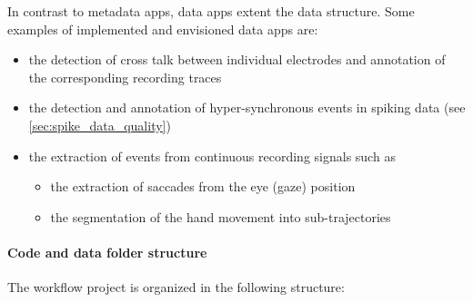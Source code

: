 In contrast to metadata apps, data apps extent the  data structure. Some examples of implemented and envisioned data apps are:
\begin{itemize}
  \setlength{\itemsep}{0pt}
  \setlength{\parskip}{0pt}
  \setlength{\parsep}{0pt}
 \item the detection of cross talk between individual electrodes and annotation of the corresponding recording traces
  \item the detection and annotation of hyper-synchronous events in spiking data (see \cref{sec:spike_data_quality})
 \item the extraction of events from continuous recording signals such as
 \begin{itemize}
  \setlength\itemsep{0pt}
  \setlength{\parskip}{0pt}
  \setlength{\parsep}{0pt}
  \item the extraction of saccades from the eye (gaze) position
  \item the segmentation of the hand movement into sub-trajectories
 \end{itemize}
\end{itemize}


\paragraph{Code and data folder structure}
The workflow project is organized in the following structure:\\

\renewcommand*\DTstylecomment{\color{gray}\textit}
\renewcommand*\DTstyle{\textcolor{black!90}}
\begin{minipage}[t]{\textwidth}
\ \\
\end{minipage}

